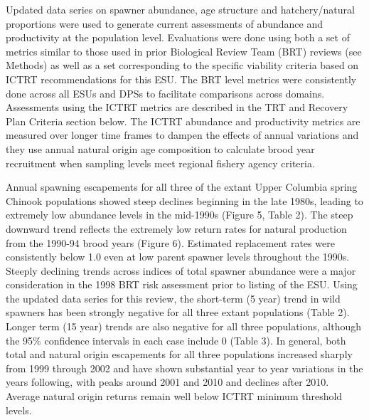 \documentclass[
  letterpaper,
  oneside,
  open=any]{scrbook}
\begin{document}
Updated data series on spawner abundance, age structure and
hatchery/natural proportions were used to generate current assessments
of abundance and productivity at the population level. Evaluations were
done using both a set of metrics similar to those used in prior
Biological Review Team (BRT) reviews (see Methods) as well as a set
corresponding to the specific viability criteria based on ICTRT
recommendations for this ESU. The BRT level metrics were consistently
done across all ESUs and DPSs to facilitate comparisons across domains.
Assessments using the ICTRT metrics are described in the TRT and
Recovery Plan Criteria section below. The ICTRT abundance and
productivity metrics are measured over longer time frames to dampen the
effects of annual variations and they use annual natural origin age
composition to calculate brood year recruitment when sampling levels
meet regional fishery agency criteria.

Annual spawning escapements for all three of the extant Upper Columbia
spring Chinook populations showed steep declines beginning in the late
1980s, leading to extremely low abundance levels in the mid-1990s
(Figure 5, Table 2). The steep downward trend reflects the extremely low
return rates for natural production from the 1990-94 brood years (Figure
6). Estimated replacement rates were consistently below 1.0 even at low
parent spawner levels throughout the 1990s. Steeply declining trends
across indices of total spawner abundance were a major consideration in
the 1998 BRT risk assessment prior to listing of the ESU. Using the
updated data series for this review, the short-term (5 year) trend in
wild spawners has been strongly negative for all three extant
populations (Table 2). Longer term (15 year) trends are also negative
for all three populations, although the 95\% confidence intervals in
each case include 0 (Table 3). In general, both total and natural origin
escapements for all three populations increased sharply from 1999
through 2002 and have shown substantial year to year variations in the
years following, with peaks around 2001 and 2010 and declines after
2010. Average natural origin returns remain well below ICTRT minimum
threshold levels.
\end{document}
